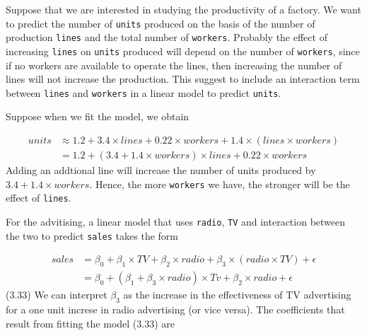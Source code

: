 \documentclass[
  letterpaper,
  DIV=11,
  numbers=noendperiod]{scrreprt}
\begin{document}
\begin{tcolorbox}[enhanced jigsaw, colback=white, leftrule=.75mm, opacitybacktitle=0.6, colframe=quarto-callout-note-color-frame, breakable, toptitle=1mm, titlerule=0mm, toprule=.15mm, left=2mm, bottomtitle=1mm, coltitle=black, arc=.35mm, title=\textcolor{quarto-callout-note-color}{\faInfo}\hspace{0.5em}{Productivy of a factory}, opacityback=0, colbacktitle=quarto-callout-note-color!10!white, bottomrule=.15mm, rightrule=.15mm]

Suppose that we are interested in studying the productivity of a
factory. We want to predict the number of \texttt{units} produced on the
basis of the number of production \texttt{lines} and the total number of
\texttt{workers}. Probably the effect of increasing \texttt{lines} on
\texttt{units} produced will depend on the number of \texttt{workers},
since if no workers are available to operate the lines, then increasing
the number of lines will not increase the production. This suggest to
include an interaction term between \texttt{lines} and \texttt{workers}
in a linear model to predict \texttt{units}.

Suppose when we fit the model, we obtain

\[
\begin{align}
units &\approx 1.2 + 3.4 \times lines + 0.22 \times workers + 1.4 \times (lines \times workers) \\
&= 1.2 + (3.4 + 1.4 \times workers) \times lines + 0.22 \times workers
\end{align}
\] Adding an addtional line will increase the number of units produced
by \(3.4 + 1.4 \times workers\). Hence, the more \texttt{workers} we
have, the stronger will be the effect of \texttt{lines}.

\end{tcolorbox}

For the advitising, a linear model that uses \texttt{radio}, \texttt{TV}
and interaction between the two to predict \texttt{sales} takes the form

\[
\begin{align}
sales &= \beta_0 + \beta_1 \times TV + \beta_2 \times radio + \beta_3 \times(radio \times TV) + \epsilon \\
&= \beta_0 + (\beta_1 + \beta_3 \times radio)\times Tv + \beta_2 \times radio + \epsilon
\end{align}
\] (3.33) We can interpret \(\beta_3\) as the increase in the
effectiveness of TV advertising for a one unit increse in radio
advertising (or vice versa). The coefficients that result from fitting
the model (3.33) are
\end{document}
